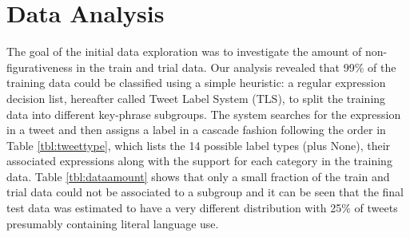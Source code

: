 \documentclass[11pt,letterpaper]{article}
\begin{document}



\section{Data Analysis}\label{sec:data}
\label{sec::dataanalysis}
The goal of the initial data exploration was to investigate the amount of non-figurativeness in the train and trial data. %
Our analysis revealed that 99\% of the training data could be classified using a simple heuristic:  a regular expression decision list, hereafter called Tweet Label System (TLS),  to split the training data into different key-phrase subgroups. The system searches for the expression in a tweet and then assigns a label in a cascade fashion following the order in Table \ref{tbl:tweettype}, %
which lists the 14 possible label types (plus {\sc None}), their associated expressions along with the support for each category in the training data. Table \ref{tbl:dataamount} shows that only a small fraction of the train and trial data could not be associated to a subgroup and it can be seen that the final test data was estimated to have a very different distribution with 25\% of tweets presumably containing literal language use.
\end{document}
